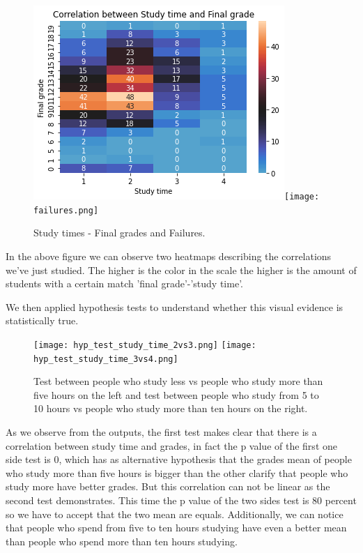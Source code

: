 \documentclass[a4paper, 11pt]{article}
\theoremstyle{definition}
\numberwithin{equation}{section}		%
\numberwithin{table}{section}				%
\begin{document}
\begin{itemize}
\begin{figure}[h]\centering
\includegraphics[scale=0.5]{g3-st.png}\quad\texttt{[image: failures.png]}
\caption{Study times - Final grades and Failures.}
\end{figure}

In the above figure we can observe two heatmaps describing the correlations we've just studied. The higher is the color in the scale the higher is the amount of students with a certain match 'final grade'-'study time'.

We then applied hypothesis tests to understand whether this visual evidence 
is statistically true.

\begin{figure}[h]\centering
\texttt{[image: hyp\_test\_study\_time\_2vs3.png]}
\texttt{[image: hyp\_test\_study\_time\_3vs4.png]}
\caption{Test between people who study less vs people who study more than five hours on the left and test between people who study from 5 to 10 hours
vs people who study more than ten hours on the right.}
\end{figure}

As we observe from the outputs, the first test makes clear that there is a
correlation between study time and grades, in fact the p value of the first 
one side test is 0, which has as alternative hypothesis that the grades mean of people who study more than five hours is bigger than the other clarify that people who study more have better grades.  But this correlation can not
be linear as the second test demonstrates. This time the p value of the two
sides test is 80 percent so we have to accept that the two mean are equals. 
Additionally, we can notice that people who spend from five to ten hours 
studying have even a better mean than people who spend more than ten hours 
studying.



\end{itemize}
\end{document}
